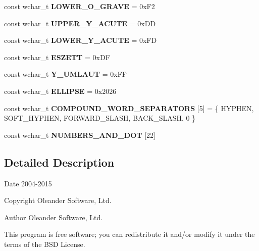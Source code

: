\begin{DoxyCompactItemize}
\item 
\hypertarget{group___indexing_ga5e7dc4a09ae39860f8aaa48a0b98b4ce}{const wchar\-\_\-t {\bfseries L\-O\-W\-E\-R\-\_\-\-O\-\_\-\-G\-R\-A\-V\-E} = 0x\-F2}\label{group___indexing_ga5e7dc4a09ae39860f8aaa48a0b98b4ce}

\item 
\hypertarget{group___indexing_ga1b4f4cd0bc6b78681984a17c9fc26e0e}{const wchar\-\_\-t {\bfseries U\-P\-P\-E\-R\-\_\-\-Y\-\_\-\-A\-C\-U\-T\-E} = 0x\-D\-D}\label{group___indexing_ga1b4f4cd0bc6b78681984a17c9fc26e0e}

\item 
\hypertarget{group___indexing_ga53e1e8926e859e8223ddf8ebcb5580ae}{const wchar\-\_\-t {\bfseries L\-O\-W\-E\-R\-\_\-\-Y\-\_\-\-A\-C\-U\-T\-E} = 0x\-F\-D}\label{group___indexing_ga53e1e8926e859e8223ddf8ebcb5580ae}

\item 
\hypertarget{group___indexing_ga4b59e121ca1941919de08b198683e38c}{const wchar\-\_\-t {\bfseries E\-S\-Z\-E\-T\-T} = 0x\-D\-F}\label{group___indexing_ga4b59e121ca1941919de08b198683e38c}

\item 
\hypertarget{group___indexing_gab411a04ad2384e0ff28185ec9545c260}{const wchar\-\_\-t {\bfseries Y\-\_\-\-U\-M\-L\-A\-U\-T} = 0x\-F\-F}\label{group___indexing_gab411a04ad2384e0ff28185ec9545c260}

\item 
\hypertarget{group___indexing_ga98fc5a5b5dfbeb78c48a4af5b1b35d2c}{const wchar\-\_\-t {\bfseries E\-L\-L\-I\-P\-S\-E} = 0x2026}\label{group___indexing_ga98fc5a5b5dfbeb78c48a4af5b1b35d2c}

\item 
\hypertarget{group___indexing_ga8180bb8a67673f8c11678ce3e0a11cd2}{const wchar\-\_\-t {\bfseries C\-O\-M\-P\-O\-U\-N\-D\-\_\-\-W\-O\-R\-D\-\_\-\-S\-E\-P\-A\-R\-A\-T\-O\-R\-S} \mbox{[}5\mbox{]} = \{ H\-Y\-P\-H\-E\-N, S\-O\-F\-T\-\_\-\-H\-Y\-P\-H\-E\-N, F\-O\-R\-W\-A\-R\-D\-\_\-\-S\-L\-A\-S\-H, B\-A\-C\-K\-\_\-\-S\-L\-A\-S\-H, 0 \}}\label{group___indexing_ga8180bb8a67673f8c11678ce3e0a11cd2}

\item 
const wchar\-\_\-t {\bfseries N\-U\-M\-B\-E\-R\-S\-\_\-\-A\-N\-D\-\_\-\-D\-O\-T} \mbox{[}22\mbox{]}
\end{DoxyCompactItemize}


\subsection{Detailed Description}
\begin{DoxyDate}{Date}
2004-\/2015 
\end{DoxyDate}
\begin{DoxyCopyright}{Copyright}
Oleander Software, Ltd. 
\end{DoxyCopyright}
\begin{DoxyAuthor}{Author}
Oleander Software, Ltd.
\end{DoxyAuthor}
This program is free software; you can redistribute it and/or modify it under the terms of the B\-S\-D License. 